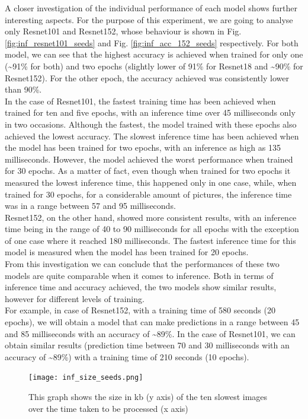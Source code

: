A closer investigation of the individual performance of each model shows further interesting aspects. For the purpose of this experiment, we are going to analyse only Resnet101 and Resnet152, whose behaviour is shown in Fig. \ref{fig:inf_resnet101_seeds} and Fig. \ref{fig:inf_acc_152_seeds} respectively. For both model, we can see that the highest accuracy is achieved when trained for only one (\textasciitilde91\% for both) and two epochs (slightly lower of 91\% for Resnet18 and \textasciitilde90\% for Resnet152). For the other epoch, the accuracy achieved was consistently lower than 90\%. \\
In the case of Resnet101, the fastest training time has been achieved when trained for ten and five epochs, with an inference time over 45 milliseconds only in two occasions. Although the fastest, the model trained with these epochs also achieved the lowest accuracy. The slowest inference time has been achieved when the model has been trained for two epochs, with an inference as high as 135 milliseconds. However, the model achieved the worst performance when trained for 30 epochs. As a matter of fact, even though when trained for two epochs it measured the lowest inference time, this happened only in one case, while, when trained for 30 epochs, for a considerable amount of pictures, the inference time was in a range between 57 and 95 milliseconds. \\
Resnet152, on the other hand, showed more consistent results, with an inference time being in the range of 40 to 90 milliseconds for all epochs with the exception of one case where it reached 180 milliseconds. The fastest inference time for this model is measured when the model has been trained for 20 epochs.\\
From this investigation we can conclude that the performances of these two models are quite comparable when it comes to inference. Both in terms of inference time and accuracy achieved, the two models show similar results, however for different levels of training. \\
For example, in case of Resnet152, with a training time of 580 seconds (20 epochs), we will obtain a model that can make predictions in a range between 45 and 85 milliseconds with an accuracy of \textasciitilde89\%. In the case of Resnet101, we can obtain similar results (prediction time between 70 and 30 milliseconds with an accuracy of \textasciitilde89\%) with a training time of 210 seconds (10 epochs). \\

\begin{figure}[h]
       \centering 
	    \texttt{[image: inf\_size\_seeds.png]}
        \caption[Size of the images over inference time for the seedlings dataset]{This graph shows the size in kb (y axis) of the ten slowest images over the time taken to be processed (x axis)}
         \label{fig:inf_size_seeds}
\end{figure}


